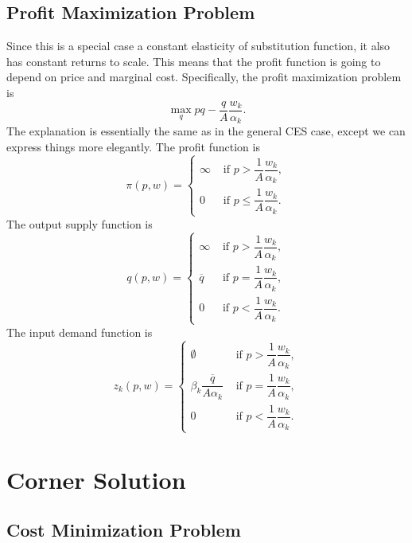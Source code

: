 \documentclass[12pt]{article}
\theoremstyle{definition}
\begin{document}
\subsection{Profit Maximization Problem} 
Since this is a special case a constant elasticity of substitution function, it also has constant returns to scale. This means that the profit function is going to depend on price and marginal cost. Specifically, the profit maximization problem is
	\[ \max_{q} pq -  \frac{q}{A} \frac{ w_k}{ \alpha_k}.	\]
The explanation is essentially the same as in the general CES case, except we can express things more elegantly. The profit function is
\[ \pi(p,w)=
\begin{cases}
	\infty		& \text{ if } p >  \dfrac{1}{A} \dfrac{ w_k}{ \alpha_k},\\[2ex]
	0		& \text{ if } p \leq  \dfrac{1}{A} \dfrac{ w_k}{ \alpha_k}.
\end{cases}
\]
The output supply function is
\[ q(p,w)=
\begin{cases}
	\infty		& \text{ if } p >  \dfrac{1}{A} \dfrac{ w_k}{ \alpha_k},\\[2ex]
	\overline{q}		& \text{ if } p =  \dfrac{1}{A} \dfrac{ w_k}{ \alpha_k},\\[2ex]
	0		& \text{ if } p <  \dfrac{1}{A} \dfrac{ w_k}{ \alpha_k}.
\end{cases}
\]
The input demand function is 
\[ z_k(p,w)=
\begin{cases}
	\emptyset		& \text{ if } p >  \dfrac{1}{A} \dfrac{ w_k}{ \alpha_k},\\[2ex]
	 \beta_k \dfrac{\overline{q}}{A \alpha_k}		& \text{ if } p =  \dfrac{1}{A} \dfrac{ w_k}{ \alpha_k},\\[2ex]
	0		& \text{ if } p <  \dfrac{1}{A} \dfrac{ w_k}{ \alpha_k}.
\end{cases}
\]



\section{Corner Solution}

\subsection{Cost Minimization Problem}
\end{document}
